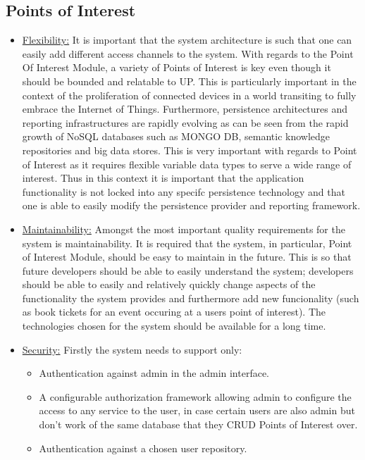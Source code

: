 \documentclass[runningheads,a4paper]{article}
\begin{document}
\subsection{Points of Interest}
\begin{itemize}
\item \underline {Flexibility:}
It is important that the system architecture is such that one can easily
add different access channels to the system. With regards to the Point Of Interest Module, a variety of Points of Interest is key even though it should be bounded and relatable to UP. This is particularly important in the context of the proliferation of connected devices in a world transiting to fully embrace the Internet of Things.
Furthermore, persistence architectures and reporting infrastructures are rapidly evolving as can
be seen from the rapid growth of NoSQL databases such as MONGO DB, semantic knowledge repositories and big data stores. This is very important with regards to Point of Interest as it requires flexible variable data types to serve a wide range of interest. Thus in this context it is important that the application functionality is not locked into any specifc persistence technology and that one is able to easily modify the persistence provider and reporting framework.

\item \underline {Maintainability:}
Amongst the most important quality requirements for the system is maintainability. It is required that the system, in particular, Point of Interest Module, should be easy to maintain in the future. This is so that future developers should be able to easily understand the system; developers should be able to easily and relatively quickly change aspects of the functionality the system provides and furthermore add new funcionality (such as book tickets for an event occuring at a users point of interest).
The technologies chosen for the system should be available for a long time. 

\item \underline {Security:}
Firstly the system needs to support only:
\begin{itemize}
\item Authentication against admin in the admin interface.
\item A configurable authorization framework allowing admin to configure the access to any service to the user, in case certain users are also admin but don't work of the same database that they CRUD Points of Interest over. 
\item Authentication against a chosen user repository. 
\end{itemize}


\end{itemize}
\end{document}

